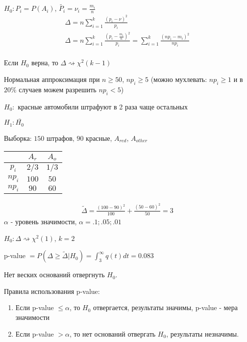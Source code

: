 \documentclass{article}
\begin{document}
$H_0: P_i=P(A_i)$, $\tilde{P_i}=\nu_i=\frac{m_i}{n}$
\begin{gather*}
  \Delta = n \sum_{i=1}^{k}\frac{(p_i - \nu)^{2}}{p_i} \\
  \Delta = n \sum_{i=1}^{k}\frac{(p_i - \frac{m_i}{n})^{2}}{p_i}
  = \sum_{i=1}^{k}\frac{(np_i - m_i)^{2}}{np_i} \\
\end{gather*}
\begin{theorem}
  Если $H_0$ верна, то $\Delta \rightsquigarrow \chi^{2}(k-1)$
\end{theorem}
\begin{remark}
  Нормальная аппроксимация при $n \ge 50$, $ np_i \ge 5$
  (можно мухлевать: $np_i \ge 1$ и в $20\%$ случаев можем разрешить $np_i < 5$)
\end{remark}
\begin{eg}
  $H_0:$ красные автомобили штрафуют в 2 раза чаще остальных

  $H_1: \bar{H_0}$

  Выборка: $150$ штрафов, $90$ красные, $A_{red}$, $A_{other}$
\begin{center}
\begin{tabular}{| c | c | c |}
  \hline
   & $A_{r}$ & $A_o$ \\ 
  \hline
  $p_i$ & $2/3$ & $1/3$ \\
  \hline
  $np_i$ & $100$ & $50$ \\
  \hline
  $np_i$ & $90$ & $60$ \\
  \hline
\end{tabular}
\end{center}
\begin{gather*}
  \tilde{\Delta} = \frac{(10 0 -90)^{2}}{10 0} + \frac{(50-60)^{2}}{50}=3
\end{gather*}
$\alpha$ - уровень значимости, $\alpha=.1; \boxed{.05}; .01$

$H_0: \Delta \rightsquigarrow \chi^{2}(1)$, $k=2$

p-value $= P(\Delta \ge \tilde{\Delta}| H_0)=\int_{3}^{\infty}q(t)dt=0.083$

Нет веских оснований отвергнуть $H_0$.

\hr
\begin{remark}
  Правила использования p-value:
  \begin{enumerate}
    \item Если p-value $\le \alpha$, то $H_0$ отвергается, результаты значимы,
      p-value - мера значимости
    \item Если p-value $>\alpha$, то нет оснований отвергать $H_0$,
      результаты незначимы.


\end{enumerate}
\end{remark}
\end{eg}
\end{document}
